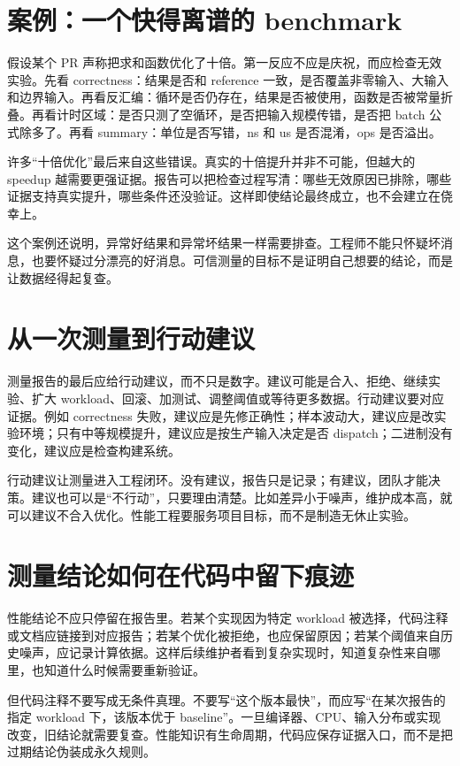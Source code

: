 \section{案例：一个快得离谱的 benchmark}

假设某个 PR 声称把求和函数优化了十倍。第一反应不应是庆祝，而应检查无效实验。先看 correctness：结果是否和 reference 一致，是否覆盖非零输入、大输入和边界输入。再看反汇编：循环是否仍存在，结果是否被使用，函数是否被常量折叠。再看计时区域：是否只测了空循环，是否把输入规模传错，是否把 batch 公式除多了。再看 summary：单位是否写错，ns 和 us 是否混淆，ops 是否溢出。

许多“十倍优化”最后来自这些错误。真实的十倍提升并非不可能，但越大的 speedup 越需要更强证据。报告可以把检查过程写清：哪些无效原因已排除，哪些证据支持真实提升，哪些条件还没验证。这样即使结论最终成立，也不会建立在侥幸上。

这个案例还说明，异常好结果和异常坏结果一样需要排查。工程师不能只怀疑坏消息，也要怀疑过分漂亮的好消息。可信测量的目标不是证明自己想要的结论，而是让数据经得起复查。

\section{从一次测量到行动建议}

测量报告的最后应给行动建议，而不只是数字。建议可能是合入、拒绝、继续实验、扩大 workload、回滚、加测试、调整阈值或等待更多数据。行动建议要对应证据。例如 correctness 失败，建议应是先修正确性；样本波动大，建议应是改实验环境；只有中等规模提升，建议应是按生产输入决定是否 dispatch；二进制没有变化，建议应是检查构建系统。

行动建议让测量进入工程闭环。没有建议，报告只是记录；有建议，团队才能决策。建议也可以是“不行动”，只要理由清楚。比如差异小于噪声，维护成本高，就可以建议不合入优化。性能工程要服务项目目标，而不是制造无休止实验。

\section{测量结论如何在代码中留下痕迹}

性能结论不应只停留在报告里。若某个实现因为特定 workload 被选择，代码注释或文档应链接到对应报告；若某个优化被拒绝，也应保留原因；若某个阈值来自历史噪声，应记录计算依据。这样后续维护者看到复杂实现时，知道复杂性来自哪里，也知道什么时候需要重新验证。

但代码注释不要写成无条件真理。不要写“这个版本最快”，而应写“在某次报告的指定 workload 下，该版本优于 baseline”。一旦编译器、CPU、输入分布或实现改变，旧结论就需要复查。性能知识有生命周期，代码应保存证据入口，而不是把过期结论伪装成永久规则。


